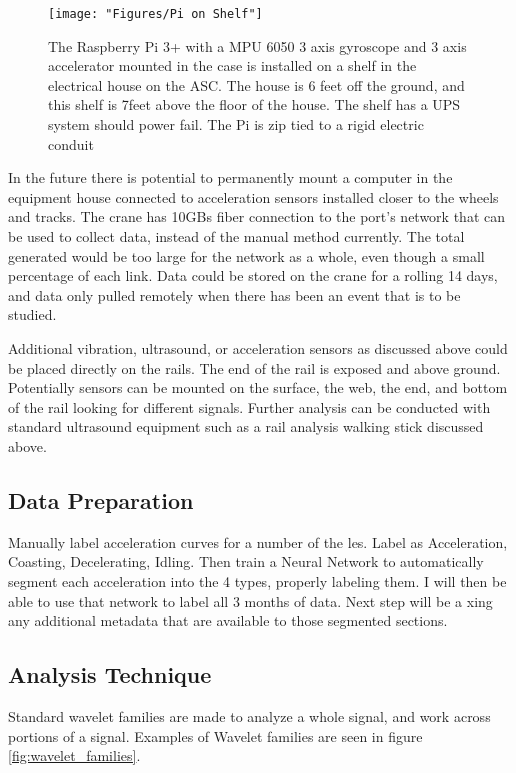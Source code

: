 \documentclass[journal=jacsat,manuscript=article]{achemso}
\begin{document}
\begin{figure}
	\centering
	\texttt{[image: "Figures/Pi on Shelf"]}
	\caption[Sensor on a Shelf in the ASC House]{The Raspberry Pi 3+ with a MPU 6050 3 axis gyroscope and 3 axis accelerator mounted in the case is installed on a shelf in the electrical house on the ASC.  The house is 6 feet off the ground, and this shelf is 7feet above the floor of the house.  The shelf has a UPS system should power fail.  The Pi is zip tied to a rigid electric conduit}
	\label{fig:mounted_pi}
\end{figure}

In the future there is potential to permanently mount a computer in the equipment house connected to acceleration sensors installed closer to the wheels and tracks.  The crane has 10GBs fiber connection to the port’s network that can be used to collect data, instead of the manual method currently.  The total generated would be too large for the network as a whole, even though a small percentage of each link.  Data could be stored on the crane for a rolling 14 days, and data only pulled remotely when there has been an event that is to be studied.

Additional vibration, ultrasound, or acceleration sensors as discussed above could be placed directly on the rails.  The end of the rail is exposed and above ground.  Potentially sensors can be mounted on the surface, the web, the end, and bottom of the rail looking for different signals.  Further analysis can be conducted with standard ultrasound equipment such as a rail analysis walking stick discussed above.

\subsection{Data Preparation}
Manually label acceleration curves for a number of the les. Label as Acceleration, Coasting, Decelerating, Idling. Then train a Neural Network to automatically segment each acceleration into the 4 types, properly labeling them. I will then be able to use that network to label all 3 months of data. Next step will be a xing any additional metadata that are available to those segmented sections. 

\subsection{Analysis Technique}
Standard wavelet families are made to analyze a whole signal, and work across portions of a signal.  Examples of Wavelet families are seen in figure \ref{fig:wavelet_families}.  
\end{document}
